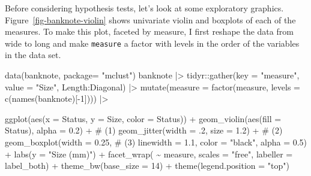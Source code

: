 \documentclass[
  letterpaper,
  10pt,
  krantz2]{krantz}
\makeatletter
\newenvironment{Shaded}{\begin{snugshade}}{\end{snugshade}}
\newcommand{\AttributeTok}[1]{\textcolor[rgb]{0.40,0.45,0.13}{#1}}
\newcommand{\CommentTok}[1]{\textcolor[rgb]{0.37,0.37,0.37}{#1}}
\newcommand{\DecValTok}[1]{\textcolor[rgb]{0.68,0.00,0.00}{#1}}
\newcommand{\FloatTok}[1]{\textcolor[rgb]{0.68,0.00,0.00}{#1}}
\newcommand{\FunctionTok}[1]{\textcolor[rgb]{0.28,0.35,0.67}{#1}}
\newcommand{\NormalTok}[1]{\textcolor[rgb]{0.00,0.23,0.31}{#1}}
\newcommand{\SpecialCharTok}[1]{\textcolor[rgb]{0.37,0.37,0.37}{#1}}
\newcommand{\StringTok}[1]{\textcolor[rgb]{0.13,0.47,0.30}{#1}}
\newenvironment{kframe}{%
  \medskip{}
  \setlength{\fboxsep}{.8em}
  \def\at@end@of@kframe{}%
  \ifinner\ifhmode%
  \def\at@end@of@kframe{\end{minipage}}%
  \begin{minipage}{\columnwidth}%
  \fi\fi%
  \def\FrameCommand##1{\hskip\@totalleftmargin \hskip-\fboxsep
  \colorbox{shadecolor}{##1}\hskip-\fboxsep
      \hskip-\linewidth \hskip-\@totalleftmargin \hskip\columnwidth}%
  \MakeFramed {\advance\hsize-\width
    \@totalleftmargin\z@ \linewidth\hsize
    \@setminipage}}%
{\par\unskip\endMakeFramed%
  \at@end@of@kframe}
\renewenvironment{Shaded}{\begin{kframe}}{\end{kframe}}
\makeatother
\begin{document}
Before considering hypothesis tests, let's look at some exploratory
graphics. Figure~\ref{fig-banknote-violin} shows univariate violin and
boxplots of each of the measures. To make this plot, faceted by measure,
I first reshape the data from wide to long and make \texttt{measure} a
factor with levels in the order of the variables in the data set.

\begin{Shaded}
\begin{Highlighting}[]
\FunctionTok{data}\NormalTok{(banknote, }\AttributeTok{package=} \StringTok{"mclust"}\NormalTok{)}
\NormalTok{banknote }\SpecialCharTok{|\textgreater{}}
\NormalTok{  tidyr}\SpecialCharTok{::}\FunctionTok{gather}\NormalTok{(}\AttributeTok{key =} \StringTok{"measure"}\NormalTok{, }
                \AttributeTok{value =} \StringTok{"Size"}\NormalTok{, }
\NormalTok{                Length}\SpecialCharTok{:}\NormalTok{Diagonal) }\SpecialCharTok{|\textgreater{}} 
  \FunctionTok{mutate}\NormalTok{(}\AttributeTok{measure =} \FunctionTok{factor}\NormalTok{(measure, }
                          \AttributeTok{levels =} \FunctionTok{c}\NormalTok{(}\FunctionTok{names}\NormalTok{(banknote)[}\SpecialCharTok{{-}}\DecValTok{1}\NormalTok{]))) }\SpecialCharTok{|\textgreater{}} 

  \FunctionTok{ggplot}\NormalTok{(}\FunctionTok{aes}\NormalTok{(}\AttributeTok{x =}\NormalTok{ Status, }\AttributeTok{y =}\NormalTok{ Size, }\AttributeTok{color =}\NormalTok{ Status)) }\SpecialCharTok{+}
  \FunctionTok{geom\_violin}\NormalTok{(}\FunctionTok{aes}\NormalTok{(}\AttributeTok{fill =}\NormalTok{ Status), }\AttributeTok{alpha =} \FloatTok{0.2}\NormalTok{) }\SpecialCharTok{+}           \CommentTok{\# (1)}
  \FunctionTok{geom\_jitter}\NormalTok{(}\AttributeTok{width =}\NormalTok{ .}\DecValTok{2}\NormalTok{, }\AttributeTok{size =} \FloatTok{1.2}\NormalTok{) }\SpecialCharTok{+}                    \CommentTok{\# (2)}
  \FunctionTok{geom\_boxplot}\NormalTok{(}\AttributeTok{width =} \FloatTok{0.25}\NormalTok{,                               }\CommentTok{\# (3)}
               \AttributeTok{linewidth =} \FloatTok{1.1}\NormalTok{, }
               \AttributeTok{color =} \StringTok{"black"}\NormalTok{, }
               \AttributeTok{alpha =} \FloatTok{0.5}\NormalTok{) }\SpecialCharTok{+}
  \FunctionTok{labs}\NormalTok{(}\AttributeTok{y =} \StringTok{"Size (mm)"}\NormalTok{) }\SpecialCharTok{+}
  \FunctionTok{facet\_wrap}\NormalTok{( }\SpecialCharTok{\textasciitilde{}}\NormalTok{ measure, }\AttributeTok{scales =} \StringTok{"free"}\NormalTok{, }\AttributeTok{labeller =}\NormalTok{ label\_both) }\SpecialCharTok{+}
  \FunctionTok{theme\_bw}\NormalTok{(}\AttributeTok{base\_size =} \DecValTok{14}\NormalTok{) }\SpecialCharTok{+}
  \FunctionTok{theme}\NormalTok{(}\AttributeTok{legend.position =} \StringTok{"top"}\NormalTok{)}
\end{Highlighting}
\end{Shaded}
\end{document}
